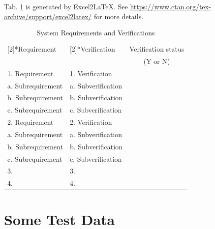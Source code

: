 \documentclass{senior-design}
\begin{document}
\begin{appendices}
    Tab. \ref{tab:srv} is generated by Excel2LaTeX. See \url{https://www.ctan.org/tex-archive/support/excel2latex/} for more details.
    \begin{table}[htbp]
        \centering
        \caption{System Requirements and Verifications}
        \begin{tabularx}{\textwidth}{X|X|c}
            \toprule
            \centering\multirow{2}[2]{*}{Requirement} & \centering\multirow{2}[2]{*}{Verification} & \multicolumn{1}{c}{Verification status} \\
            \multicolumn{1}{c|}{}                     & \multicolumn{1}{c|}{}                      & \multicolumn{1}{c}{(Y or N)}                     \\
            \midrule
            1. Requirement                            & 1. Verification                            & \multirow{4}[1]{*}{}                             \\
            a. Subrequirement                         & a. Subverification                         &                                                  \\
            b. Subrequirement                         & b. Subverification                         &                                                  \\
            c. Subrequirement                         & c. Subverification                         &                                                  \\\hline
            2. Requirement                            & 2. Verification                            & \multirow{4}[0]{*}{}                             \\
            a. Subrequirement                         & a. Subverification                         &                                                  \\
            b. Subrequirement                         & b. Subverification                         &                                                  \\
            c. Subrequirement                         & c. Subverification                         &                                                  \\\hline
            3.                                        & 3.                                         &                                                  \\\hline
            4.                                        & 4.                                         &                                                  \\\bottomrule
        \end{tabularx}%
        \label{tab:srv}%
    \end{table}%

    \section{Some Test Data}
\end{appendices}
\end{document}
